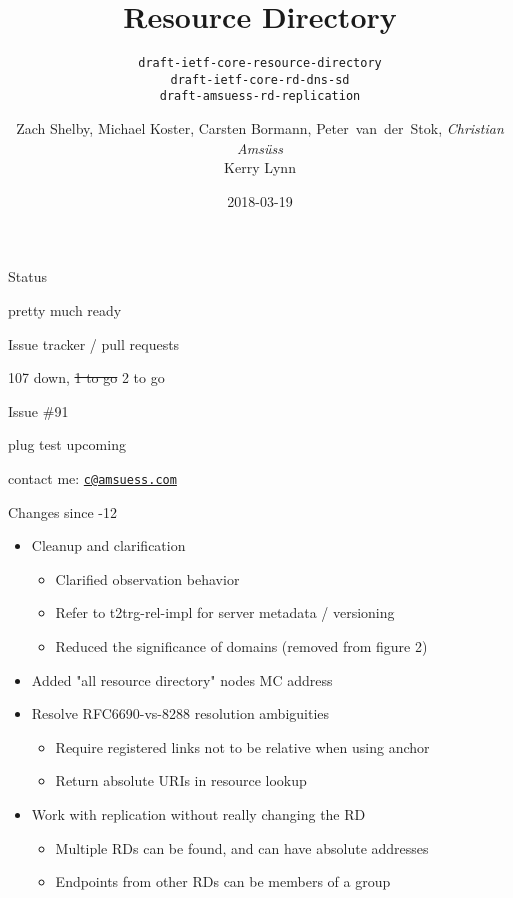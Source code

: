 \documentclass{beamer}
\title{Resource Directory}
\subtitle{\texttt{draft-ietf-core-resource-directory\\draft-ietf-core-rd-dns-sd\\draft-amsuess-rd-replication}}
\author{Zach Shelby, Michael Koster, Carsten Bormann, Peter~van~der~Stok, \textit{Christian Amsüss}\\Kerry Lynn}
\date{2018-03-19}
\begin{document}
\frame{\titlepage}

\begin{frame}{Status}\begin{center}\Huge
	pretty much ready
\end{center}\end{frame}

\begin{frame}{Issue tracker / pull requests}\begin{center}\Huge
	107 down, \st{1 to go} 2 to go
\end{center}\end{frame}

\begin{frame}{Issue \#91}\begin{center}\Huge
	{\Huge plug test upcoming}

	\vspace{2cm}

	\Large contact me: \href{mailto:c@amsuess.com}{\texttt{c@amsuess.com}}
\end{center}\end{frame}

\begin{frame}{Changes since -12}
\begin{itemize}
	\item Cleanup and clarification
	\begin{itemize}
		\item Clarified observation behavior
		\item Refer to t2trg-rel-impl for server metadata / versioning
		\item Reduced the significance of domains (removed from figure 2)
	\end{itemize}

	\item Added "all resource directory" nodes MC address

	\item Resolve RFC6690-vs-8288 resolution ambiguities
	\begin{itemize}
		\item Require registered links not to be relative when using anchor
		\item Return absolute URIs in resource lookup
	\end{itemize}

	\item Work with replication without really changing the RD
	\begin{itemize}
		\item Multiple RDs can be found, and can have absolute addresses
		\item Endpoints from other RDs can be members of a group
	\end{itemize}
\end{itemize}
\end{frame}
\end{document}
